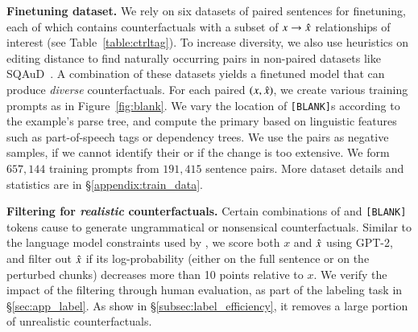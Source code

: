 
\textbf{Finetuning dataset.}
We rely on six datasets of paired sentences for finetuning, each of which contains counterfactuals with a subset of $x \rightarrow \hat{x}$ relationships of interest (see Table~\ref{table:ctrltag}). 
To increase diversity, we also use heuristics on editing distance to find naturally occurring pairs in non-paired datasets like SQAuD~\cite{rajpurkar-etal-2016-squad}.
A combination of these datasets yields a finetuned model that can produce \emph{diverse} counterfactuals.
For each paired $(x, \hat{x})$, we create various training prompts as in Figure~\ref{fig:blank}.
We vary the location of \texttt{[BLANK]}s according to the example's parse tree, and compute the primary \tagstrshort based on linguistic features such as part-of-speech tags or dependency trees.
We use the pairs as negative samples, if we cannot identify their \tagstr or if the change is too extensive.
We form $657,144$ training prompts from $191,415$ sentence pairs. 
More dataset details and \tagstrshort statistics are in \S\ref{appendix:train_data}.




\textbf{Filtering for \emph{realistic} counterfactuals.}
Certain combinations of \tagstrs and \texttt{[BLANK]} tokens cause \sysname to generate ungrammatical or nonsensical counterfactuals. 
Similar to the language model constraints used by \citet{morris2020textattack}, we score both $x$ and $\hat{x}$ using GPT-2, and filter out $\hat{x}$ if its log-probability (either on the full sentence or on the perturbed chunks) decreases more than 10 points relative to $x$.
We verify the impact of the filtering through human evaluation, as part of the labeling task in \S\ref{sec:app_label}.
As show in \S\ref{subsec:label_efficiency}, it removes a large portion of unrealistic counterfactuals.

